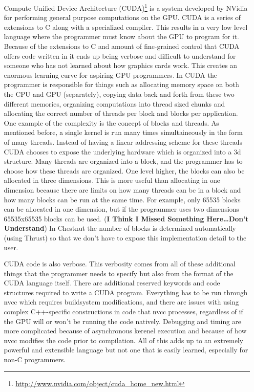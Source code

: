 \documentclass[twocolumn]{article}
\renewcommand{\|}{\origbar} %
\begin{document}
Compute Unified Device Architecture (CUDA)\footnote{\url{http://www.nvidia.com/object/cuda_home_new.html}} is a system developed by NVidia for performing general purpose computations on the GPU. CUDA is a series of extensions to C along with a specialized compiler. This results in a very low level language where the programmer must know about the GPU to program for it. Because of the extensions to C and amount of fine-grained control that CUDA offers code written in it ends up being verbose and difficult to understand for someone who has not learned about how graphics cards work. This creates an enormous learning curve for aspiring GPU programmers. In CUDA the programmer is responsible for things such as allocating memory space on both the CPU and GPU (separately), copying data back and forth from these two different memories, organizing computations into thread sized chunks and allocating the correct number of threads per block and blocks per application. One example of the complexity is the concept of blocks and threads. As mentioned before, a single kernel is run many times simultaineously in the form of many threads. Instead of having a linear addressing scheme for these threads CUDA chooses to expose the underlying hardware which is organized into a 3d structure. Many threads are organized into a block, and the programmer has to choose how these threads are organized. One level higher, the blocks can also be allocated in three dimensions. This is more useful than allocating in one dimension because there are limits on how many threads can be in a block and how many blocks can be run at the same time. For example, only 65535 blocks can be allocated in one dimension, but if the programmer uses two dimensions 65535x65535 blocks can be used. ({\bf I Think I Missed Something Here\dots Don't Understand}) In Chestnut the number of blocks is determined automatically (using Thrust) so that we don't have to expose this implementation detail to the user.

CUDA code is also verbose. This verbosity comes from all of these additional things that the programmer needs to specify but also from the format of the CUDA language itself. There are additional reserved keywords and code structures required to write a CUDA program. Everything has to be run through nvcc which requires buildsystem modifications, and there are issues with using complex C++-specific constructions in code that nvcc processes, regardless of if the GPU will or won't be running the code natively. Debugging and timing are more complicated because of asynchronous kerenel execution and because of how nvcc modifies the code prior to compilation. All of this adds up to an extremely powerful and extensible language but not one that is easily learned, especially for non-C programmers.
\end{document}
